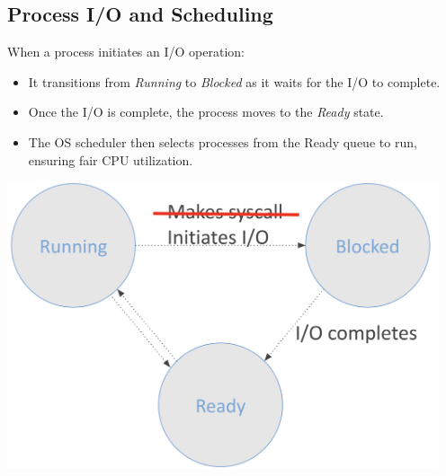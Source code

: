 \documentclass[../../compsys.tex]{subfiles}
\begin{document}
\subsection{Process I/O and Scheduling}
When a process initiates an I/O operation:\\
\begin{minipage}[htp]{0.45\textwidth}
\begin{itemize}
  \item It transitions from \emph{Running} to \emph{Blocked} as it waits for the I/O to complete.
  \item Once the I/O is complete, the process moves to the \emph{Ready} state.
  \item The OS scheduler then selects processes from the Ready queue to run, ensuring fair CPU utilization.
\end{itemize}
\end{minipage} 
\hfill 
\vline 
\hfill 
\begin{minipage}[htp]{0.45\textwidth}
\begin{center}
  \includegraphics[width=0.95\textwidth]{chapters/L3/images/diagram.png}
\end{center}
\end{minipage}
\vspace{20px}
\end{document}
